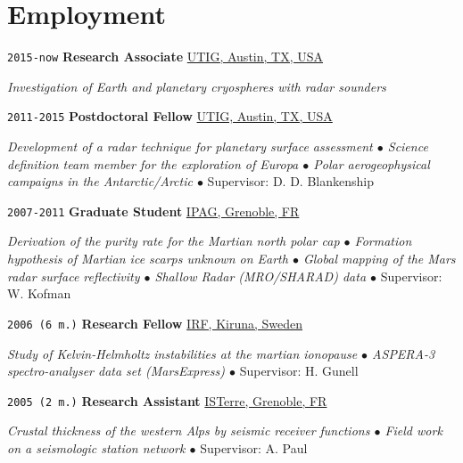 
\section*{Employment}

\TabPositions{7em,32em}

\noindent \texttt{2015-now} \tab \textbf{Research Associate} \tab
\href{https://www.ig.utexas.edu/}{UTIG, Austin, TX, USA}
\begin{adjustwidth}{7em}{}
\textit{Investigation of Earth and planetary cryospheres with radar sounders}
\end{adjustwidth}
\vspace{.5em}

\noindent \texttt{2011-2015} \tab \textbf{Postdoctoral Fellow} \tab
\href{https://www.ig.utexas.edu/}{UTIG, Austin, TX, USA}
\begin{adjustwidth}{7em}{}
\textit{Development of a radar technique for planetary surface assessment $\bullet$ Science definition team member for the exploration of Europa $\bullet$ Polar aerogeophysical campaigns in the Antarctic/Arctic $\bullet$} Supervisor: D. D. Blankenship
\end{adjustwidth}
\vspace{.5em}

\noindent \texttt{2007-2011} \tab \textbf{Graduate Student} \tab
\href{http://ipag.osug.fr/}{IPAG, Grenoble, FR}
\vspace{.3em}
\begin{adjustwidth}{7em}{}
\textit{Derivation of the purity rate for the Martian north polar cap $\bullet$ Formation hypothesis of Martian ice scarps unknown on Earth $\bullet$ Global mapping of the Mars radar surface reflectivity $\bullet$ Shallow Radar (MRO/SHARAD) data $\bullet$} Supervisor: W. Kofman
\end{adjustwidth}
\vspace{.5em}

\noindent \texttt{2006 (6 m.)} \tab \textbf{Research Fellow} \tab
\href{https://www2.irf.se/}{IRF, Kiruna, Sweden}
\vspace{.3em}
\begin{adjustwidth}{7em}{}
\textit{Study of Kelvin-Helmholtz instabilities at the martian ionopause $\bullet$ ASPERA-3 spectro-analyser data set (MarsExpress) $\bullet$} Supervisor: H. Gunell
\end{adjustwidth}
\vspace{.5em}

\noindent \texttt{2005 (2 m.)} \tab \textbf{Research Assistant} \tab
\href{https://www.isterre.fr/}{ISTerre, Grenoble, FR}
\vspace{.3em}
\begin{adjustwidth}{7em}{}
\textit{Crustal thickness of the western Alps by seismic receiver functions $\bullet$ Field work on a seismologic station network $\bullet$} Supervisor: A. Paul
\end{adjustwidth}
\vspace{.5em}

